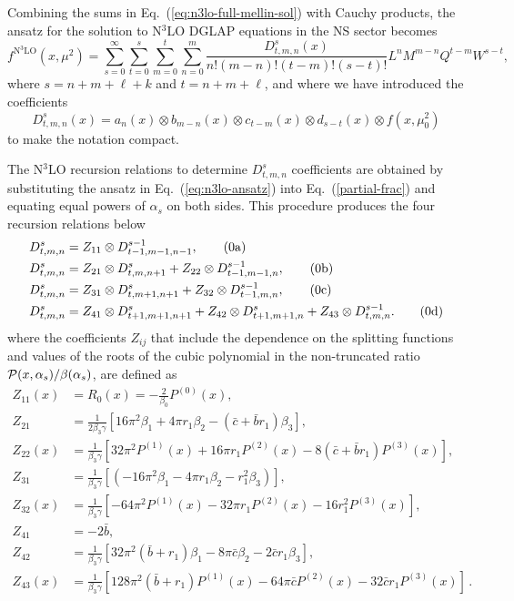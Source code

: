 \documentclass[12pt,notitlepage,aps,preprintnumbers,superscriptaddress,nofootinbib,aps,prd,floatfix]{revtex4-2}
\begin{document}
Combining the sums in Eq.~(\ref{eq:n3lo-full-mellin-sol}) with Cauchy products, the ansatz for the solution to N$^3$LO DGLAP equations in the NS sector becomes 
%
\begin{equation}
f^{\mathrm{N}^3\mathrm{LO}}(x,\mu^2) = \sum_{s=0}^\infty\sum_{t=0}^s\sum_{m=0}^t\sum_{n=0}^m \frac{D^s_{t,m,n}(x)}{n!(m-n)!(t-m)!(s-t)!}L^n M^{m-n}Q^{t-m}W^{s-t},
\label{eq:n3lo-ansatz}
\end{equation}
where $s=n+m+\ell+k$ and $t=n+m+\ell$, and  where we have introduced the coefficients
\begin{equation}
D_{t,m,n}^{s}(x)= a_{n}(x)\otimes
b_{m-n}(x)\otimes c_{t-m}(x) \otimes d_{s-t}(x) \otimes f(x,\mu_0^2)
\end{equation}
to make the notation compact.

The N$^3$LO recursion relations to determine $D^s_{t,m,n}$ coefficients are obtained by substituting the ansatz in Eq.~(\ref{eq:n3lo-ansatz}) into Eq.~(\ref{partial-frac}) and equating equal powers of $\alpha_s$ on both sides. This procedure produces the four recursion relations below
%
\begin{align}
D^s_{t,m,n} &= Z_{11} \otimes D^{s-1}_{t-1,m-1,n-1}, \label{eq:n3lo-resum-1}\tag{\theequation{a}}\\
D^s_{t,m,n} &= Z_{21}\otimes D^s_{t,m,n+1} + Z_{22} \otimes D^{s-1}_{t-1,m-1,n}, 
\label{eq:n3lo-resum-2}\tag{\theequation{b}}\\
D^s_{t,m,n} &= Z_{31} \otimes D^s_{t,m+1,n+1} + Z_{32} \otimes D^{s-1}_{t-1,m,n}, 
\label{eq:n3lo-resum-3}\tag{\theequation{c}}\\
D^s_{t,m,n} &= Z_{41} \otimes D^s_{t+1,m+1,n+1} + Z_{42} \otimes D^s_{t+1,m+1,n} + Z_{43} \otimes D^{s-1}_{t,m,n}.\label{eq:n3lo-resum-4}\tag{\theequation{d}}
\end{align}
where the coefficients $Z_{ij}$ that include the dependence on the splitting functions and values of the roots of the cubic polynomial in the non-truncated ratio ${\cal P}(x,\alpha_s)/\beta(\alpha_s)$, are defined as
\begin{align}
Z_{11}(x) &= R_0(x) = -\frac{2}{\beta_0} P^{(0)}(x),  
\nonumber\\
Z_{21} &= \frac{1}{2\beta_3\gamma}\left[ 16\pi^2\beta_1 + 4\pi r_1\beta_2 - (\bar{c} + \bar{b} r_1)\beta_3 \right], 
\nonumber\\
Z_{22}(x) &= \frac{1}{\beta_3\gamma}\left[32\pi^2P^{(1)}(x) + 16\pi r_1 P^{(2)}(x) - 8(\bar{c}+\bar{b}r_1)P^{(3)} (x)\right], 
\nonumber\\
Z_{31} &=\frac{1}{\beta_3\gamma} \left[(-16\pi^2\beta_1 - 4\pi r_1\beta_2 - r_1^2\beta_3)\right], 
\nonumber\\
Z_{32}(x) &= \frac{1}{\beta_3\gamma} \left[- 64\pi^2 P^{(1)}(x) - 32\pi r_1 P^{(2)}(x) - 16 r_1^2 P^{(3)}(x)\right], 
\nonumber\\
Z_{41} &= -2 \bar{b},  
\nonumber\\
Z_{42} &= \frac{1}{\beta_3\gamma}\left[ 32\pi^2(\bar{b}+r_1)\beta_1  -8\pi \bar{c}\beta_2 - 2\bar{c}r_1\beta_3 \right],  
\nonumber\\
Z_{43}(x)& = \frac{1}{\beta_3\gamma}\left[ 128\pi^2(\bar{b}+r_1) P^{(1)}(x) - 64\pi \bar{c} P^{(2)}(x) - 32 \bar{c} r_1 P^{(3)}(x) \right]\,.
\label{Zij-def}
\end{align}
\end{document}
